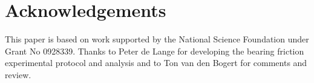 \documentclass[a4paper]{article}
\begin{document}
\section*{Acknowledgements}

This paper is based on work supported by the National Science Foundation under
Grant No 0928339. Thanks to Peter de Lange for developing the bearing friction
experimental protocol and analysis and to Ton van den Bogert for comments and
review.



\end{document}
